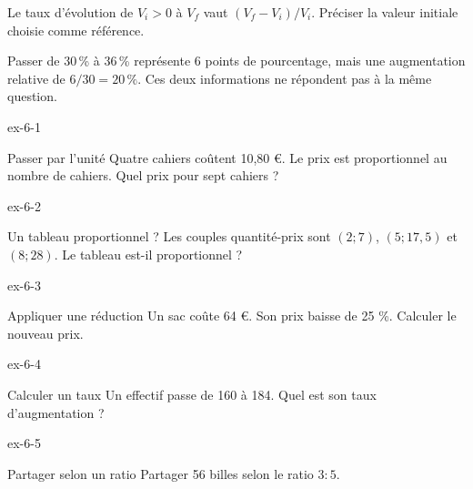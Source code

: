 \begin{propriete}Le taux d’évolution de $V_i>0$ à $V_f$ vaut $(V_f-V_i)/V_i$. Préciser la valeur initiale choisie comme référence.\end{propriete}
\begin{attention}Passer de 30\,\% à 36\,\% représente 6 points de pourcentage, mais une augmentation relative de $6/30=20\,\%$. Ces deux informations ne répondent pas à la même question.\end{attention}
\clearpage{}
\begin{blocLivre}{ex-6-1}\begin{exercice}[1]{Passer par l’unité}
Quatre cahiers coûtent 10,80 €. Le prix est proportionnel au nombre de cahiers. Quel prix pour sept cahiers ?
\end{exercice}\end{blocLivre}
\begin{blocLivre}{ex-6-2}\begin{exercice}[1]{Un tableau proportionnel ?}
Les couples quantité-prix sont $(2;7)$, $(5;17{,}5)$ et $(8;28)$. Le tableau est-il proportionnel ?
\end{exercice}\end{blocLivre}
\begin{blocLivre}{ex-6-3}\begin{exercice}[1]{Appliquer une réduction}
Un sac coûte 64 €. Son prix baisse de 25 \%. Calculer le nouveau prix.
\end{exercice}\end{blocLivre}
\begin{blocLivre}{ex-6-4}\begin{exercice}[1]{Calculer un taux}
Un effectif passe de 160 à 184. Quel est son taux d’augmentation ?
\end{exercice}\end{blocLivre}
\begin{blocLivre}{ex-6-5}\begin{exercice}[1]{Partager selon un ratio}
Partager 56 billes selon le ratio $3:5$.
\end{exercice}\end{blocLivre}

